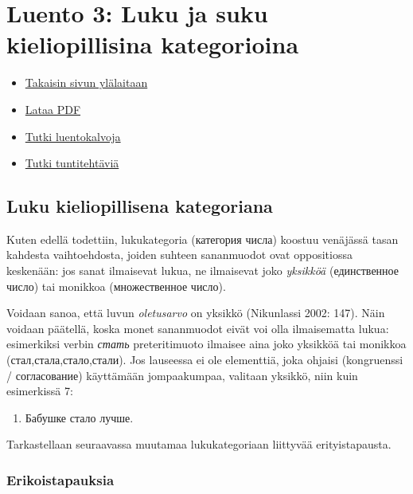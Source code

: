 \documentclass[]{scrartcl}
\providecommand{\tightlist}{%
  \setlength{\itemsep}{0pt}\setlength{\parskip}{0pt}}
\begin{document}
\section{Luento 3: Luku ja suku kieliopillisina
kategorioina}\label{luento-3-luku-ja-suku-kieliopillisina-kategorioina}

\begin{itemize}
\tightlist
\item
  \href{https://mustikka.uta.fi/~juho_harme/morfologia/\#tästä-kurssista}{Takaisin
  sivun ylälaitaan}
\item
  \href{http://mustikka.uta.fi/~juho_harme/morfologia/materiaalit/luento3.pdf}{Lataa
  PDF}
\item
  \href{http://mustikka.uta.fi/~juho_harme/morfologia/presentations/luento3.html}{Tutki
  luentokalvoja}
\item
  \href{http://mustikka.uta.fi/~juho_harme/morfologia/tehtavat/luento3.pdf}{Tutki
  tuntitehtäviä}
\end{itemize}

\subsection{Luku kieliopillisena
kategoriana}\label{luku-kieliopillisena-kategoriana}

Kuten edellä todettiin, lukukategoria (категория числа) koostuu
venäjässä tasan kahdesta vaihtoehdosta, joiden suhteen sananmuodot ovat
oppositiossa keskenään: jos sanat ilmaisevat lukua, ne ilmaisevat joko
\emph{yksikköä} (единственное число) tai monikkoa (множественное число).

Voidaan sanoa, että luvun \emph{oletusarvo} on yksikkö (Nikunlassi 2002:
147). Näin voidaan päätellä, koska monet sananmuodot eivät voi olla
ilmaisematta lukua: esimerkiksi verbin \emph{стать} preteritimuoto
ilmaisee aina joko yksikköä tai monikkoa (стал,стала,стало,стали). Jos
lauseessa ei ole elementtiä, joka ohjaisi (kongruenssi / согласование)
käyttämään jompaakumpaa, valitaan yksikkö, niin kuin esimerkissä 7:

\begin{enumerate}
\def\labelenumi{(\arabic{enumi})}
\setcounter{enumi}{6}
\tightlist
\item
  Бабушке стало лучше.
\end{enumerate}

Tarkastellaan seuraavassa muutamaa lukukategoriaan liittyvää
erityistapausta.

\subsubsection{Erikoistapauksia}\label{erikoistapauksia}
\end{document}
